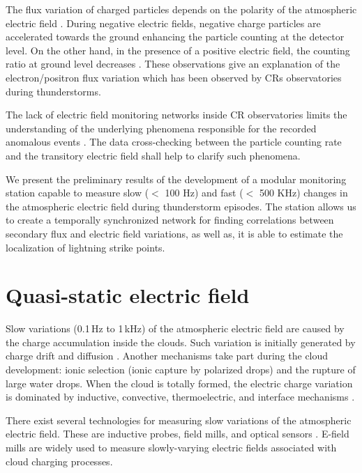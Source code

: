 \documentclass[letterpaper,12pt]{article}
\begin{document}
The flux variation of charged particles depends on the polarity of the atmospheric electric field \cite{bartoli2018observation, zhao2019effects}. During negative electric fields, negative charge particles are accelerated towards the ground enhancing the particle counting at the detector level. On the other hand, in the presence of a positive electric field, the counting ratio at ground level decreases \cite{dorman2013cosmic}. These observations give an explanation of the electron/positron flux variation which has been observed by CRs observatories during thunderstorms.

The lack of electric field monitoring networks inside CR observatories limits the understanding of the underlying phenomena responsible for the recorded anomalous events \cite{Colalillo2017, Merenda2019}. The data cross-checking between the particle counting rate and the transitory electric field shall help to clarify such phenomena.

We present the preliminary results of the development of a modular monitoring station capable to measure slow ($<$ 100 Hz) and fast ($<$ 500 KHz) changes in the atmospheric electric field during thunderstorm episodes. The station allows us to create a temporally synchronized network for finding correlations between secondary flux and electric field variations, as well as, it is able to estimate the localization of lightning strike points.

\section{Quasi-static electric field}

Slow variations (0.1\,Hz to 1\,kHz) of the atmospheric electric field are caused by the charge accumulation inside the clouds. Such variation is initially generated by charge drift and diffusion \cite{gunn1957experimental}. Another mechanisms take part during the cloud development: ionic selection (ionic capture by polarized drops) \cite{stow1969atmospheric} and the rupture of large water drops\cite{matthews1964electrification}. When the cloud is totally formed, the electric charge variation is dominated by inductive, convective, thermoelectric, and interface mechanisms \cite{vonnegut1955possible, latham1961generation}.

There exist several technologies for measuring slow variations of the atmospheric electric field. These are inductive probes, field mills, and optical sensors \cite{miles2009report}. E-field mills are widely used to measure slowly-varying electric fields associated with cloud charging processes. 
\end{document}
